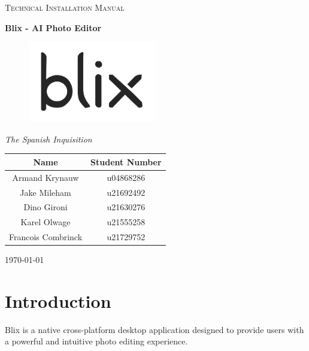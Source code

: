 \documentclass[11pt,a4paper]{article}
\begin{document}
\begin{titlepage}
	\centering
    {\scshape\LARGE Technical Installation Manual\par}
    \vspace{1.5cm}
    {\huge\bfseries Blix - AI Photo Editor\par}
    \begin{figure}[h]
        \centering %
        \includegraphics[width=0.5\textwidth]{../pics/blix.png}
    \end{figure}
    \vspace{2.5cm}
    {\Large\itshape The Spanish Inquisition\par}
	\begin{tabular}{|c|c|}
		\hline
		\textbf{Name} 		& \textbf{Student Number} \\
		\hline
		Armand Krynauw		& u04868286  \\
		Jake Mileham		& u21692492  \\
		Dino Gironi			& u21630276  \\
		Karel Olwage		& u21555258  \\
		Francois Combrinck	& u21729752  \\
		\hline
	\end{tabular}
    \vfill
    {\large \today\par}
\end{titlepage}

\tableofcontents
\pagebreak


\section*{Introduction}

Blix is a native cross-platform desktop application designed to provide users
with a powerful and intuitive photo editing experience.
\end{document}
